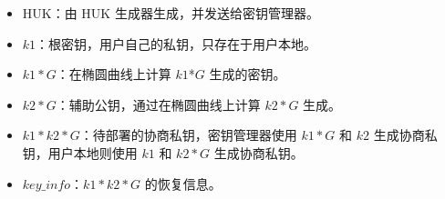 \documentclass[main\_\_CN.tex]{subfiles}
\begin{document}
\begin{itemize}
    \item HUK：由 HUK 生成器生成，并发送给密钥管理器。
    \item \hyperref[para:k1]{\begin{math}k1\end{math}}：根密钥，用户自己的私钥，只存在于用户本地。
    \item \hyperref[para:k1G]{\begin{math}k1*G\end{math}}：在椭圆曲线上计算 \hyperref[para:k1]{\begin{math}k1\end{math}}*\begin{math}G\end{math} 生成的密钥。
    \item \hyperref[para:k2G]{\begin{math}k2*G\end{math}}：辅助公钥，通过在椭圆曲线上计算 \hyperref[para:k2G]{\begin{math}k2*G\end{math}} 生成。
    \item \hyperref[para:k1k2G]{\begin{math}k1*k2*G\end{math}}：待部署的协商私钥，密钥管理器使用 \hyperref[para:k1G]{\begin{math}k1*G\end{math}} 和 \hyperref[para:k2]{\begin{math}k2\end{math}} 生成协商私钥，用户本地则使用 \hyperref[para:k1]{\begin{math}k1\end{math}} 和 \hyperref[para:k2G]{\begin{math}k2*G\end{math}} 生成协商私钥。
    \item \hyperref[para:keyinfo]{\begin{math}key\_info\end{math}}：\hyperref[para:k1k2G]{\begin{math}k1*k2*G\end{math}} 的恢复信息。
\end{itemize}
\end{document}
